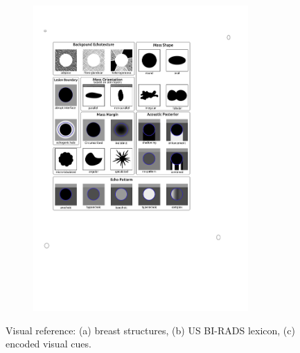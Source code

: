 \begin{figure}
\begin{subfigure}[b]{0.34\textwidth}
        \includegraphics[trim = 65 345 200 124, clip,width=0.9\textwidth]{birads}
        \label{fig:features:lexicon}
    \end{subfigure}
    \hfill
    \begin{subfigure}[b]{0.2\textwidth}
      \newcommand{\insertVisualCue}[2]{
        \tikz{\node[label=above:#2]{\texttt{[image: \#1]}};}
      }
      \centering
      \begin{tiny}
        \insertVisualCue{AppearanceCues}{Appearance}
        \vfill
        \insertVisualCue{AtlasCues}{{Atlas, Brightness}}
        \vfill
        \insertVisualCue{siftCues}{SIFT-BoF}
      \end{tiny}
      \label{fig:features:relation}
    \end{subfigure}
    \hfill
    \caption {{\footnotesize Visual reference: (a) breast structures, (b) US BI-RADS lexicon, (c) encoded visual cues.}} 
    \label{fig:features}
\end{figure}

